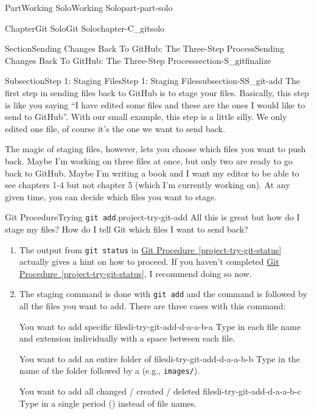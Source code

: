 \documentclass[oneside,10pt,]{book}
\newcommand{\xreffont}{\relax}
\newcommand{\mono}[1]{\texttt{#1}}
\newcommand{\kbd}[1]{\keys{{#1}}}
\begin{document}
\begin{partptx}{Part}{Working Solo}{}{Working Solo}{}{}{part-part-solo}
\begin{chapterptx}{Chapter}{Git Solo}{}{Git Solo}{}{}{chapter-C_gitsolo}
\begin{sectionptx}{Section}{Sending Changes Back To GitHub: The Three-Step Process}{}{Sending Changes Back To GitHub: The Three-Step Process}{}{}{section-S_gitfinalize}
\begin{subsectionptx}{Subsection}{Step 1: Staging Files}{}{Step 1: Staging Files}{}{}{subsection-SS_git-add}
%
%
%
The first step in sending files back to GitHub is to stage your files. Basically, this step is like you saying ``I have edited some files and these are the ones I would like to send to GitHub''. With our small example, this step is a little silly. We only edited one file, of course it's the one we want to send back.%
\par
The magic of staging files, however, lets you choose which files you want to push back. Maybe I'm working on three files at once, but only two are ready to go back to GitHub. Maybe I'm writing a book and I want my editor to be able to see chapters 1-4 but not chapter 5 (which I'm currently working on). At any given time, you can decide which files you want to stage.%
\begin{project}{Git Procedure}{Trying \mono{git add}.}{project-try-git-add}%
All this is great but how do I stage my files? How do I tell Git which files I want to send back?%
\begin{enumerate}[font=\bfseries,label=(\alph*),ref=\alph*]%
\item{}The output from \mono{git status} in \hyperref[project-try-git-status]{Git Procedure~{\xreffont\ref{project-try-git-status}}} actually gives a hint on how to proceed. If you haven't completed \hyperref[project-try-git-status]{Git Procedure~{\xreffont\ref{project-try-git-status}}}, I recommend doing so now.%
\item{}The staging command is done with \mono{git add} and the command is followed by all the files you want to add. There are three cases with this command:%
\begin{descriptionlist}
\begin{dlimedium}{You want to add specific files}{li-try-git-add-d-a-a-b-a}%
Type in each file name and extension individually with a space between each file.%
\end{dlimedium}%
\begin{dlimedium}{You want to add an entire folder of files}{li-try-git-add-d-a-a-b-b}%
Type in the name of the folder followed by a \kbd{/} (e.g.\@, \mono{images/}).%
\end{dlimedium}%
\begin{dlimedium}{You want to add all changed \slash{} created \slash{} deleted files}{li-try-git-add-d-a-a-b-c}%
Type in a single period (\kbd{.}) instead of file names.%
\end{dlimedium}%
\end{descriptionlist}
%
\par

\end{enumerate}
\end{project}
\end{subsectionptx}
\end{sectionptx}
\end{chapterptx}
\end{partptx}
\end{document}

